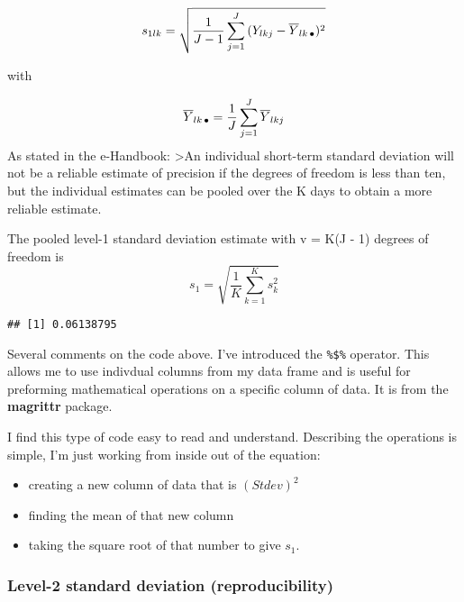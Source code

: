 \documentclass[]{book}
\newenvironment{Shaded}{\begin{snugshade}}{\end{snugshade}}
\newcommand{\DataTypeTok}[1]{\textcolor[rgb]{0.13,0.29,0.53}{#1}}
\newcommand{\DecValTok}[1]{\textcolor[rgb]{0.00,0.00,0.81}{#1}}
\newcommand{\KeywordTok}[1]{\textcolor[rgb]{0.13,0.29,0.53}{\textbf{#1}}}
\newcommand{\NormalTok}[1]{#1}
\newcommand{\OperatorTok}[1]{\textcolor[rgb]{0.81,0.36,0.00}{\textbf{#1}}}
\newcommand{\StringTok}[1]{\textcolor[rgb]{0.31,0.60,0.02}{#1}}
\providecommand{\tightlist}{%
  \setlength{\itemsep}{0pt}\setlength{\parskip}{0pt}}
\theoremstyle{definition}
\theoremstyle{definition}
\theoremstyle{definition}
\theoremstyle{remark}
\begin{document}
\[
s_{1lk} = \sqrt{\frac{1}{J-1} \sum_{j=1}^{J}{(Y_{lkj} - \overline{Y}_{lk{\small \, \bullet}})^2}}
\]

with

\[
\overline{Y}_{lk{\small \, \bullet}} = \frac{1}{J}\sum_{j=1}^{J}{\overline{Y}_{lkj}}
\] As stated in the e-Handbook: \textgreater{}An individual short-term
standard deviation will not be a reliable estimate of precision if the
degrees of freedom is less than ten, but the individual estimates can be
pooled over the K days to obtain a more reliable estimate.

The pooled level-1 standard deviation estimate with v = K(J - 1) degrees
of freedom is \[
s_1 = \sqrt{\frac{1}{K} \sum_{k=1}^{K} s_k^2}
\]

\begin{Shaded}
\end{Shaded}

\begin{verbatim}
## [1] 0.06138795
\end{verbatim}

Several comments on the code above. I've introduced the \texttt{\%\$\%}
operator. This allows me to use indivdual columns from my data frame and
is useful for preforming mathematical operations on a specific column of
data. It is from the \textbf{magrittr} package.

I find this type of code easy to read and understand. Describing the
operations is simple, I'm just working from inside out of the equation:

\begin{itemize}
\tightlist
\item
  creating a new column of data that is \((Stdev)^2\)
\item
  finding the mean of that new column
\item
  taking the square root of that number to give \(s_1\).
\end{itemize}

\hypertarget{level-2-standard-deviation-reproducibility}{%
\subsubsection{Level-2 standard deviation
(reproducibility)}\label{level-2-standard-deviation-reproducibility}}
\end{document}
